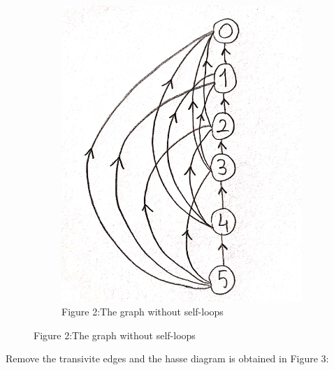 \documentclass[a4 paper]{article}
\numberwithin{equation}{section}
\newcommand{\0}{\mathbf{0}}
\begin{document}
\begin{figure}[h!]
  \centering
  \begin{subfigure}[b]{0.4\linewidth}
    \includegraphics[width=\linewidth]{fig2.png}
    \caption{Figure 2:The graph without self-loops}
  \end{subfigure}
\end{figure}
\newline\newline
Remove the transivite edges and the hasse diagram is obtained in Figure 3:
\end{document}
